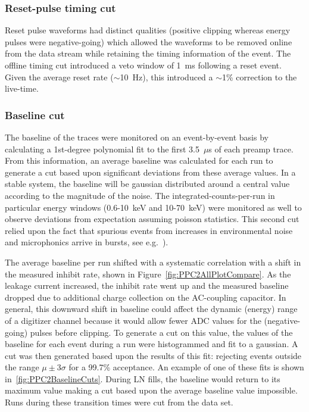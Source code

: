 			\subsubsection{Reset-pulse timing cut}
	Reset pulse waveforms had distinct qualities (positive clipping whereas energy pulses were negative-going) which allowed the waveforms to be removed online from the data stream while retaining the timing information of the event.  The offline timing cut introduced a veto window of 1~ms following a reset event.  Given the average reset rate ($\sim$10~Hz), this introduced a $\sim$1\% correction to the live-time.  

			\subsubsection{Baseline cut}	
	The baseline of the traces were monitored on an event-by-event basis by calculating a 1st-degree polynomial fit to the first 3.5~$\mu$s of each preamp trace.  From this information, an average baseline was calculated for each run to generate a cut based upon significant deviations from these average values.  In a stable system, the baseline will be gaussian distributed around a central value according to the magnitude of the noise.  The integrated-counts-per-run in particular energy windows (0.6-10~keV and 10-70~keV) were monitored as well to observe deviations from expectation assuming poisson statistics.  This second cut relied upon the fact that spurious events from increases in environmental noise and microphonics arrive in bursts, see e.g.~\cite{Morales1992410}).  
	
	The average baseline per run shifted with a systematic correlation with a shift in the measured inhibit rate, shown in Figure~\ref{fig:PPC2AllPlotCompare}.  As the leakage current increased, the inhibit rate went up and the measured baseline dropped due to additional charge collection on the AC-coupling capacitor.  In general, this downward shift in baseline could affect the dynamic (energy) range of a digitizer channel because it would allow fewer ADC values for the (negative-going) pulses before clipping.  To generate a cut on this value, the values of the baseline for each event during a run were histogrammed and fit to a gaussian.  A cut was then generated based upon the results of this fit: rejecting events outside the range $\mu\pm3\sigma$ for a 99.7\% acceptance.  An example of one of these fits is shown in~\ref{fig:PPC2BaselineCuts}.  During LN fills, the baseline would return to its maximum value making a cut based upon the average baseline value impossible.  Runs during these transition times were cut from the data set.  
		
